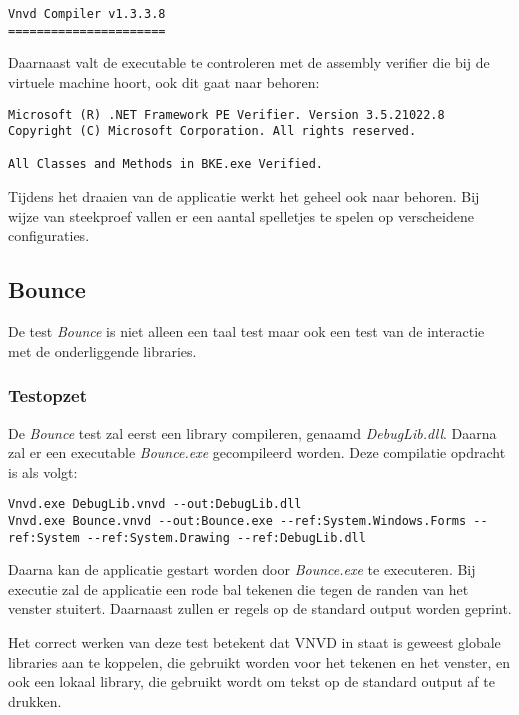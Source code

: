 \begin{lstlisting}
Vnvd Compiler v1.3.3.8
======================

\end{lstlisting}

Daarnaast valt de executable te controleren met de assembly verifier die bij de virtuele machine hoort, ook dit gaat naar behoren:

\begin{lstlisting}
Microsoft (R) .NET Framework PE Verifier. Version 3.5.21022.8
Copyright (C) Microsoft Corporation. All rights reserved.

All Classes and Methods in BKE.exe Verified.
\end{lstlisting}

Tijdens het draaien van de applicatie werkt het geheel ook naar behoren. Bij wijze van steekproef vallen er een aantal spelletjes te spelen op verscheidene configuraties.

\subsection{Bounce}
De test \textit{Bounce} is niet alleen een taal test maar ook een test van de interactie met de onderliggende libraries.

\subsubsection{Testopzet}
De \textit{Bounce} test zal eerst een library compileren, genaamd \textit{DebugLib.dll}. Daarna zal er een executable \textit{Bounce.exe} gecompileerd worden. Deze compilatie opdracht is als volgt:

\begin{lstlisting}
Vnvd.exe DebugLib.vnvd --out:DebugLib.dll
Vnvd.exe Bounce.vnvd --out:Bounce.exe --ref:System.Windows.Forms --ref:System --ref:System.Drawing --ref:DebugLib.dll
\end{lstlisting}

Daarna kan de applicatie gestart worden door \textit{Bounce.exe} te executeren. Bij executie zal de applicatie een rode bal tekenen die tegen de randen van het venster stuitert. Daarnaast zullen er regels op de standard output worden geprint.

Het correct werken van deze test betekent dat VNVD in staat is geweest globale libraries aan te koppelen, die gebruikt worden voor het tekenen en het venster, en ook een lokaal library, die gebruikt wordt om tekst op de standard output af te drukken.

